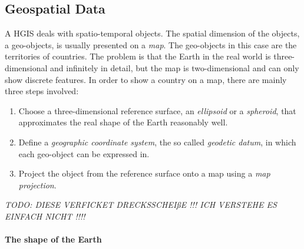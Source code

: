 
\subsection{Geospatial Data} %
\label{sub:geospatial_data}

A HGIS deals with spatio-temporal objects. The spatial dimension of the objects, a geo-objects, is usually presented on a \emph{map}. The geo-objects in this case are the territories of countries. The problem is that the Earth in the real world is three-dimensional and infinitely in detail, but the map is two-dimensional and can only show discrete features. In order to show a country on a map, there are mainly three steps involved:

\begin{enumerate}
  \item Choose a three-dimensional reference surface, an \emph{ellipsoid} or a \emph{spheroid}, that approximates the real shape of the Earth reasonably well.
  \item Define a \emph{geographic coordinate system}, the so called \emph{geodetic datum}, in which each geo-object can be expressed in.
  \item Project the object from the reference surface onto a map using a \emph{map projection}.
\end{enumerate}

\emph{TODO: DIESE VERFICKET DRECKSSCHEIßE !!! ICH VERSTEHE ES EINFACH NICHT !!!!}

\paragraph{The shape of the Earth} %
\label{par:the_shape_of_the_earth}

